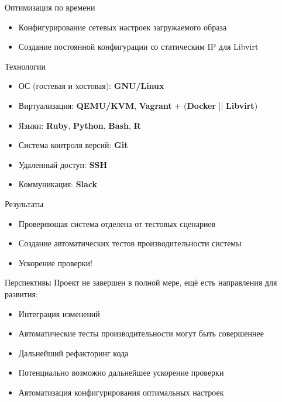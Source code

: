\documentclass{beamer}
\begin{document}
\begin{frame}{Оптимизация по времени}
	\begin{itemize}
		\item Конфигурирование сетевых настроек загружаемого образа
		\item Создание постоянной конфигурации со статическим IP для Libvirt 
	\end{itemize}
\end{frame}

\begin{frame}{Технологии}
	\begin{itemize}
		\item ОС (гостевая и хостовая): \textbf{GNU/Linux}
		\item Виртуализация: \textbf{QEMU/KVM}, \textbf{Vagrant} + (\textbf{Docker} || \textbf{Libvirt})
		\item Языки: \textbf{Ruby}, \textbf{Python}, \textbf{Bash}, \textbf{R}
		\item Система контроля версий: \textbf{Git}
		\item Удаленный доступ: \textbf{SSH}
		\item Коммуникация: \textbf{Slack}
	\end{itemize}
\end{frame}

\begin{frame}{Результаты}
	\begin{itemize}
		\item Проверяющая система отделена от тестовых сценариев
		\item Создание автоматических тестов производительности системы
		\item Ускорение проверки!
	\end{itemize}
\end{frame}

\begin{frame}{Перспективы}
	Проект не завершен в полной мере, ещё есть направления для развития:
	\begin{itemize}
		\item Интеграция изменений
		\item Автоматические тесты производительности могут быть совершеннее
		\item Дальнейший рефакторинг кода
		\item Потенциально возможно дальнейшее ускорение проверки
		\item Автоматизация конфигурирования оптимальных настроек 
	\end{itemize}
\end{frame}
\end{document}
